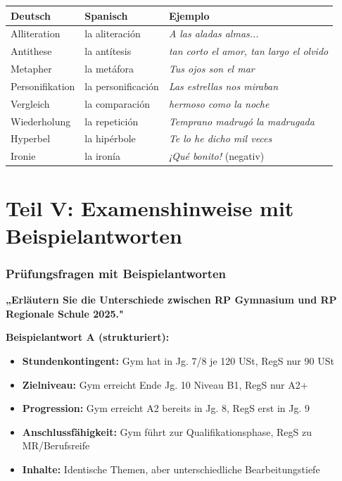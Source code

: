 \documentclass[11pt,a4paper]{article}
\begin{document}
\begin{center}
\begin{tabular}{l|l|l}
\rowcolor{lightblue}
\textbf{Deutsch} & \textbf{Spanisch} & \textbf{Ejemplo} \\
\hline
Alliteration & la aliteración & \textit{A las aladas almas...} \\
\rowcolor{lightgray}
Antithese & la antítesis & \textit{tan corto el amor, tan largo el olvido} \\
Metapher & la metáfora & \textit{Tus ojos son el mar} \\
\rowcolor{lightgray}
Personifikation & la personificación & \textit{Las estrellas nos miraban} \\
Vergleich & la comparación & \textit{hermoso como la noche} \\
\rowcolor{lightgray}
Wiederholung & la repetición & \textit{Temprano madrugó la madrugada} \\
Hyperbel & la hipérbole & \textit{Te lo he dicho mil veces} \\
\rowcolor{lightgray}
Ironie & la ironía & \textit{¡Qué bonito!} (negativ) \\
\hline
\end{tabular}
\end{center}

\newpage
\part*{Teil V: Examenshinweise mit Beispielantworten}

\section{Prüfungsfragen mit Beispielantworten}

\begin{exambox}
\textbf{„Erläutern Sie die Unterschiede zwischen RP Gymnasium und RP Regionale Schule 2025."}
\end{exambox}

\textbf{Beispielantwort A (strukturiert):}
\begin{itemize}[leftmargin=0.5cm, itemsep=1pt]
\item \textbf{Stundenkontingent:} Gym hat in Jg. 7/8 je 120 USt, RegS nur 90 USt
\item \textbf{Zielniveau:} Gym erreicht Ende Jg. 10 Niveau B1, RegS nur A2+
\item \textbf{Progression:} Gym erreicht A2 bereits in Jg. 8, RegS erst in Jg. 9
\item \textbf{Anschlussfähigkeit:} Gym führt zur Qualifikationsphase, RegS zu MR/Berufsreife
\item \textbf{Inhalte:} Identische Themen, aber unterschiedliche Bearbeitungstiefe
\end{itemize}
\end{document}
